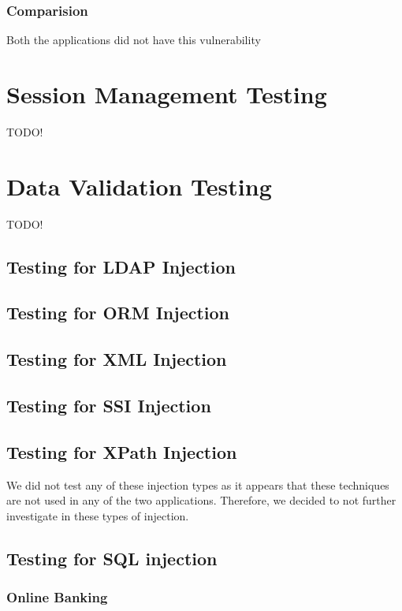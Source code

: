 \subsubsection{Comparision}
Both the applications did not have this vulnerability

\section{Session Management Testing}
TODO!

\section{Data Validation Testing}

TODO!

\subsection{Testing for LDAP Injection}
\subsection{Testing for ORM Injection}
\subsection{Testing for XML Injection}
\subsection{Testing for SSI Injection}
\subsection{Testing for XPath Injection}
We did not test any of these injection types as it appears that these techniques are not used in any of the two applications. Therefore, we decided to not further investigate in these types of injection.

\subsection{Testing for SQL injection}
\subsubsection*{Online Banking}

